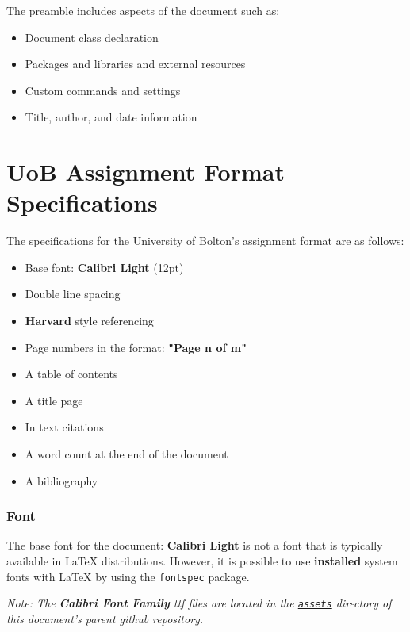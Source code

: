 \documentclass[12pt]{article}
\begin{document}
The preamble includes aspects of the document such as:

\begin{itemize}
  \item Document class declaration
  \item Packages and libraries and external resources
  \item Custom commands and settings
  \item Title, author, and date information
\end{itemize}

\section{UoB Assignment Format Specifications}
\label{sec:uob-assignment-format-specifications}

The specifications for the University of Bolton's assignment format are as follows:

\begin{itemize}
  \item Base font: \textbf{Calibri Light} (12pt)
  \item Double line spacing
  \item \textbf{Harvard} style referencing
  \item Page numbers in the format: \textbf{"Page n of m"}
  \item A table of contents
  \item A title page
  \item In text citations
  \item A word count at the end of the document
  \item A bibliography
\end{itemize}

\subsubsection{Font}
\label{sec:details}

The base font for the document: \textbf{Calibri Light} is not a font that is typically available in \LaTeX{} distributions. However, it is possible to use \textbf{installed} system fonts with \LaTeX{} by using the \texttt{fontspec} package.

\textit{ Note: The \textbf{Calibri Font Family} ttf files are located in the \texttt{\href{https://github.com/mike-shields-dev/University_of_Bolton_LaTeX_Assignment_Template/tree/main/assets}{assets}} directory of this document's parent github repository.} 
\end{document}
